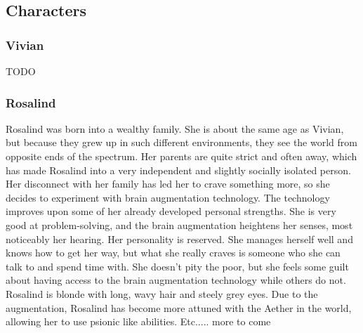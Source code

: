 \documentclass[12pt,titlepage]{article}
\newcommand\tab[1][.5in]{\hspace*{#1}}
\begin{document}





\subsection{Characters}

\subsubsection{Vivian}
TODO

\subsubsection{Rosalind}

\tab Rosalind was born into a wealthy family. She is about the same age as Vivian, 
but because they grew up in such different environments, they see the world from 
opposite ends of the spectrum. Her parents are quite strict and often away, which 
has made Rosalind into a very independent and slightly socially isolated person. 
Her disconnect with her family has led her to crave something more, so she 
decides to experiment with brain augmentation technology. The technology 
improves upon some of her already developed personal strengths. She is very 
good at problem-solving, and the brain augmentation heightens her senses, most 
noticeably her hearing. Her personality is reserved. She manages herself well and 
knows how to get her way, but what she really craves is someone who she can 
talk to and spend time with. She doesn't pity the poor, but she feels some guilt 
about having access to the brain augmentation technology while others do not. 
Rosalind is blonde with long, wavy hair and steely grey eyes. Due to the 
augmentation, Rosalind has become more attuned with the Aether in the world, 
allowing her to use psionic like abilities. Etc..... more to come
\end{document}
